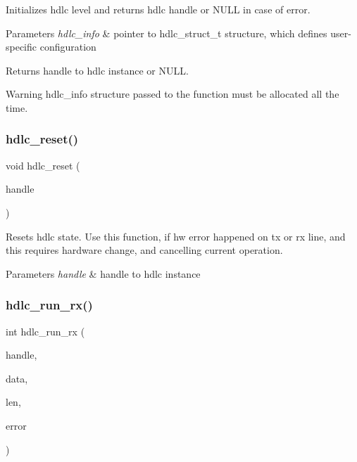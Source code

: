 Initializes hdlc level and returns hdlc handle or N\+U\+LL in case of error.


\begin{DoxyParams}{Parameters}
{\em hdlc\+\_\+info} & pointer to hdlc\+\_\+struct\+\_\+t structure, which defines user-\/specific configuration \\
\hline
\end{DoxyParams}
\begin{DoxyReturn}{Returns}
handle to hdlc instance or N\+U\+LL. 
\end{DoxyReturn}
\begin{DoxyWarning}{Warning}
hdlc\+\_\+info structure passed to the function must be allocated all the time. 
\end{DoxyWarning}
\mbox{\label{group__HDLC__API_ga532836280097de1c8881df8336f21075}} 
\subsubsection{\texorpdfstring{hdlc\+\_\+reset()}{hdlc\_reset()}}
{\footnotesize\ttfamily void hdlc\+\_\+reset (\begin{DoxyParamCaption}\item[{\hyperlink{group__HDLC__API_gabeaf7578aed5279d3af891bd85a9f961}{hdlc\+\_\+handle\+\_\+t}}]{handle }\end{DoxyParamCaption})}

Resets hdlc state. Use this function, if hw error happened on tx or rx line, and this requires hardware change, and cancelling current operation.


\begin{DoxyParams}{Parameters}
{\em handle} & handle to hdlc instance \\
\hline
\end{DoxyParams}
\mbox{\label{group__HDLC__API_ga911a3f1cb32dd6cadd00223e0097642c}} 
\subsubsection{\texorpdfstring{hdlc\+\_\+run\+\_\+rx()}{hdlc\_run\_rx()}}
{\footnotesize\ttfamily int hdlc\+\_\+run\+\_\+rx (\begin{DoxyParamCaption}\item[{\hyperlink{group__HDLC__API_gabeaf7578aed5279d3af891bd85a9f961}{hdlc\+\_\+handle\+\_\+t}}]{handle,  }\item[{const void $\ast$}]{data,  }\item[{int}]{len,  }\item[{int $\ast$}]{error }\end{DoxyParamCaption})}

